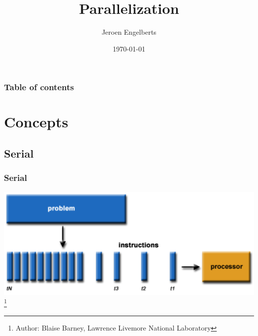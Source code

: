 \documentclass[hyperref={pdfpagelabels=false}]{beamer}
\title{Parallelization}
\subtitle{}
\author{Jeroen Engelberts}
\institute[SURFsara]{PhD Theoretical Chemistry\par Consultant for Cartesius and Lisa}
\date{\today}
\newcommand\blfootnote[1]{%
   \begingroup
   \renewcommand\thefootnote{}\footnote{#1}%
   \addtocounter{footnote}{-1}%
   \endgroup
}
\begin{document}
    \begin{frame}
        \titlepage
    \end{frame}



    \begin{frame}
        \frametitle{Table of contents}
        \tableofcontents
    \end{frame} 


    \section{Concepts} 
    \subsection{Serial}
    \begin{frame}
        \frametitle{Serial}
        \begin{center}
            \includegraphics[scale=0.4]{images/serial.png}
            \blfootnote{\tiny{Author: Blaise Barney, Lawrence Livemore National Laboratory}}
        \end{center}
    \end{frame}
    
\end{document}
